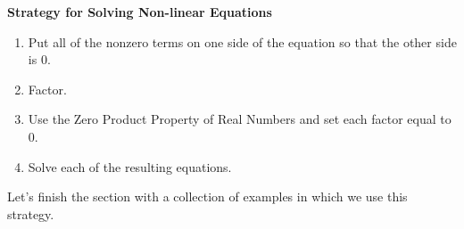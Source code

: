 \documentclass[11pt]{article}
\theoremstyle{definition}  %
\newcommand{\bbm}{\begin{boxedminipage}{6.41in}}
\newcommand{\ebm}{\end{boxedminipage}}
\begin{document}
\colorbox{ResultColor}{\bbm
\centerline{\textbf{Strategy for Solving Non-linear Equations}}

\begin{enumerate}

\item  Put all of the nonzero terms on one side of the equation so that the other side is $0$.
\item  Factor.
\item  Use the Zero Product Property of Real Numbers and set each factor equal to $0$.
\item  Solve each of the resulting equations.

\end{enumerate}

\ebm}

\medskip

Let's finish the section with a collection of examples in which we use this strategy.
\end{document}
